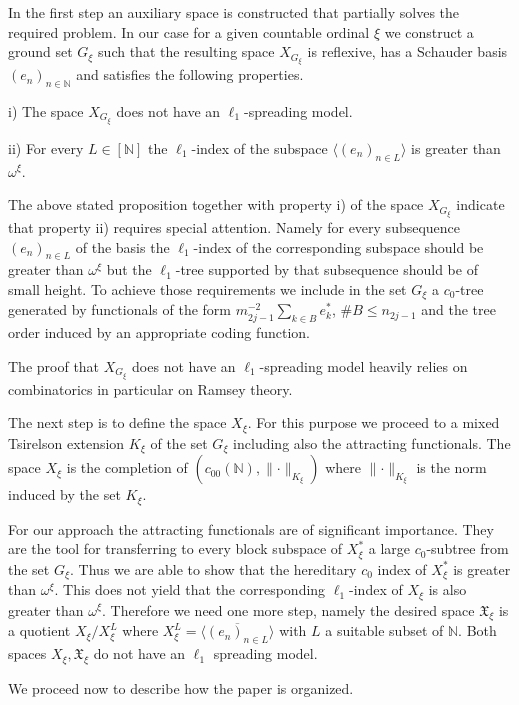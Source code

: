 \documentclass[a4paper]{amsart}
\theoremstyle{plain}
\newcommand{\N}{\mathbb{N}}
\newcommand{\norm}[1][\cdot]{\lVert #1\rVert}
\newcommand{\xn}[1][x]{(#1_{n})_{n\in\N}}
\begin{document}
In the first step an auxiliary space is constructed  that partially solves the required problem. In our case for a given countable ordinal $\xi$ we construct  a ground set  $G_{\xi}$ such that the resulting space  $X_{G_{\xi}}$  is reflexive, has a Schauder basis $\xn[e]$ and satisfies the following properties.

i) The space $X_{G_{\xi}}$  does not have an $\ell_1$-spreading model.

ii)   For every $L\in [\N]$ the  $\ell_1$-index  of the subspace $\langle (e_n)_{n\in L}\rangle$ is greater than $\omega^{\xi}$.

The above stated proposition together with property i) of the space $X_{G_{\xi}}$ indicate that property ii) requires special attention. Namely for every subsequence $(e_n)_{n\in L}$ of the basis  the  $\ell_{1}$-index of the corresponding subspace should be greater than $\omega^{\xi}$ but the  $\ell_{1}$-tree supported by that  subsequence  should be of small height.  To achieve those requirements we include  in the set $G_{\xi}$ a $c_0$-tree generated by functionals of the form $m_{2j-1}^{-2}\sum_{k\in B}e_{k}^{*}$, $\# B\leq n_{2j-1}$ and the tree order induced by an appropriate coding function.

The proof that  $X_{G_{\xi}}$ does not have an $\ell_1$-spreading model  heavily relies  on combinatorics in particular on  Ramsey theory.

The next step is to define the space $X_{\xi}$. For this purpose
we proceed to a mixed Tsirelson extension  $K_{\xi}$ of the
set $G_{\xi}$  including also the attracting functionals.
The space   $X_{\xi}$ is the completion of $(c_{00}(\N),\norm_{K_{\xi}})$
where $\norm_{K_{\xi}}$ is the norm induced by the set $K_{\xi}$.

For our approach the  attracting  functionals are of significant importance. They are  the tool for transferring   to every  block subspace of  $X_{\xi}^{*}$ a large $c_0$-subtree from the set $G_{\xi}$.
Thus  we are able to show that the hereditary $c_0$ index of $X_{\xi}^{*}$ is greater than $\omega^{\xi}$.
This  does not yield that the corresponding $\ell_{1}$-index of $X_{\xi}$ is also greater than  $\omega^{\xi}$.  Therefore we need one more step, namely the desired space $\mathfrak{X}_{\xi}$ is
a quotient $X_{\xi}/X_{\xi}^{L}$ where
$X_{\xi}^{L}=\overline{\langle (e_n)_{n\in L}\rangle}$ with
$L$ a suitable  subset of $\N$.
Both spaces $X_{\xi}, \mathfrak{X}_{\xi}$ do not have an $\ell_{1}$
spreading model.


We proceed now to  describe how the paper is organized.
\end{document}
